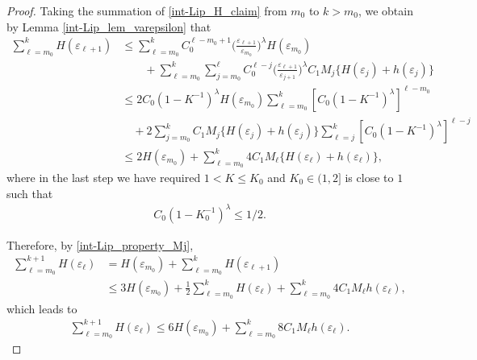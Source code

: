 \documentclass[reqno,12pt]{amsart} %
\theoremstyle{definition}
\theoremstyle{remark}
\numberwithin{equation}{section}
\begin{document}
\begin{proof}
Taking the summation of \eqref{int-Lip_H_claim} from $m_0$ to $k > m_0$, we obtain by Lemma \ref{int-Lip_lem_varepsilon} that
  \begin{align*}
    \sum_{\ell=m_0}^k H(\varepsilon_{\ell+1}) &\leq \sum_{\ell=m_0}^kC_0^{\ell-m_0+1}\Big(\frac{\varepsilon_{\ell+1}}{\varepsilon_{m_0}}\Big)^\lambda H(\varepsilon_{m_0})\\&\qquad+ \sum_{\ell=m_0}^k\sum_{j=m_0}^{\ell}C_0^{\ell-j}\Big(\frac{\varepsilon_{\ell+1}}{\varepsilon_{j+1}}\Big)^\lambda C_1M_j\{H(\varepsilon_j)+h(\varepsilon_j)\}\\&\leq 2 C_0(1-K^{-1})^{\lambda} H(\varepsilon_{m_0})\sum_{\ell={m_0}}^k[C_0(1-K^{-1})^{\lambda}]^{\ell-m_0}\\&\quad+2 \sum_{j=m_0}^kC_1M_j\{H(\varepsilon_j)+h(\varepsilon_j)\}\sum_{\ell=j}^k[C_0(1-K^{-1})^{\lambda}]^{\ell-j}\\&\leq 2H(\varepsilon_{m_0})+\sum_{\ell=m_0}^k 4C_1M_\ell\{H(\varepsilon_\ell)+h(\varepsilon_\ell)\},
  \end{align*}
  where in the last step we have required $1 < K \leq K_0$ and $K_0 \in (1,2]$ is close to $1$ such that
\begin{align}\label{int-Lip_cond_K0}
  C_0(1-K_0^{-1})^{\lambda}\le 1/2.
\end{align}

Therefore, by \eqref{int-Lip_property_Mj},
\begin{align*}
    \sum_{\ell=m_0}^{k+1}H(\varepsilon_{\ell}) & = H(\varepsilon_{m_0}) + \sum_{\ell=m_0}^{k}H(\varepsilon_{\ell+1})\\
    & \leq 3H(\varepsilon_{m_0})+\frac{1}{2} \sum_{\ell = {m_0}}^k H(\varepsilon_\ell) + \sum_{\ell = m_0}^k 4C_1M_\ell h(\varepsilon_\ell),
\end{align*}
which leads to
\begin{align}\label{int-Lip_es_H}
  \sum_{\ell = m_0}^{k+1}H(\varepsilon_{\ell})\leq 6H(\varepsilon_{m_0})+\sum_{\ell = m_0}^k8C_1M_\ell h(\varepsilon_\ell).
\end{align}


\end{proof}
\end{document}
